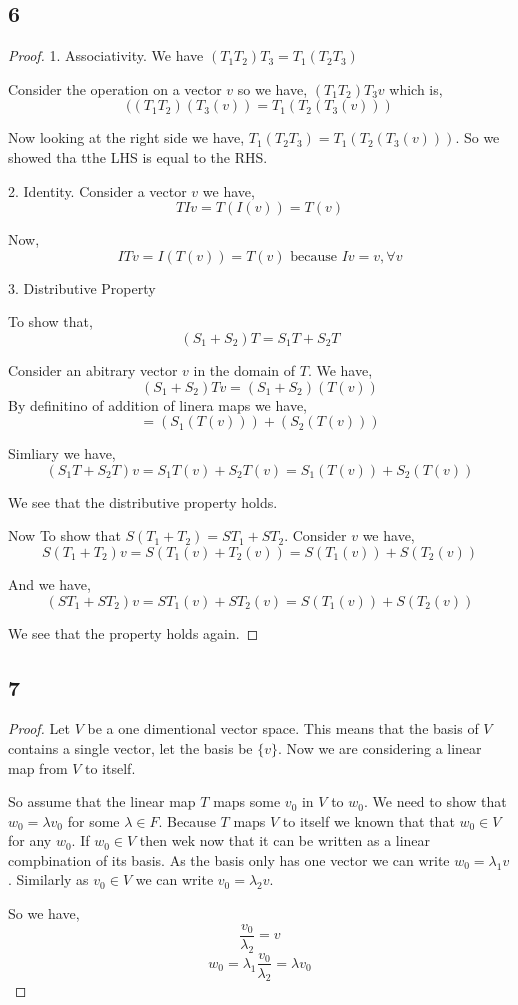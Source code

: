 \documentclass[a4paper]{report}
\begin{document}
\subsection*{6}
\begin{proof}
     
1. Associativity. We have $(T_1T_2)T_3 = T_1(T_2T_3)$

Consider the operation on a vector $v$ so we have,  $(T_1T_2)T_3v$ which is, 
$$ ((T_1T_2)(T_3(v)) = T_1(T_2(T_3(v)))$$ 

Now looking at the right side we have, $T_1(T_2T_3) = T_1(T_2(T_3(v)))$. So we showed tha tthe LHS is equal to the RHS.

2. Identity. Consider a vector $v$ we have,  
$$ TIv = T(I(v)) = T(v)$$ 

Now, 
$$ ITv = I(T(v))  = T(v) \text{ because $Iv = v, \forall v$}  $$ 

3. Distributive Property

To show that, 
$$ (S_1+S_2)T  = S_1T + S_2T$$ 

Consider an abitrary vector $v$ in the domain of $T$. We have,  
$$ (S_1+S_2)Tv = (S_1+S_2)(T(v)) $$ 
By definitino of addition of linera maps we have, 
$$= (S_1(T(v))) + (S_2(T(v)))$$ 

Simliary we have, 
$$ (S_1T + S_2T)v = S_1T(v) + S_2T(v) = S_1(T(v)) + S_2(T(v))$$ 

We see that the distributive property holds.


Now To show that $S(T_1+T_2) = ST_1 + ST_2$. Consider $v$ we have, 
$$ S(T_1+T_2)v = S(T_1(v) + T_2(v)) = S(T_1(v)) + S(T_2(v)) $$ 

And we have, 
$$ (ST_1 + ST_2)v = ST_1(v) + ST_2(v) = S(T_1(v)) + S(T_2(v))$$ 

We see that the property holds again.



\end{proof}

\subsection*{7}
\begin{proof}
    Let $V$ be a one dimentional vector space. This means that the basis of $V$ contains a single vector, let the basis be $\{v\}$. Now we are considering a linear map from  $V$ to itself. 

    So assume that the linear map $T$ maps some $v_0$ in $V$ to $w_0$. We need to show that $w_0 = \lambda v_0$ for some $\lambda \in F$. Because $T$ maps $V$ to itself we known that that $w_0 \in V$ for any $w_0$. If $w_0 \in V$ then wek now that it can be written as a linear compbination of its basis. As the basis only has one vector we can write $w_0 = \lambda_1 v$. Similarly as $v_0 \in V$ we can write $v_0 = \lambda_2 v$. 

    So we have, 
    $$ \frac{v_0}{\lambda_2} = v $$ 
    $$ w_0 = \lambda_1 \frac{v_0}{\lambda_2}  = \lambda v_0$$ 


    
\end{proof}
\end{document}
